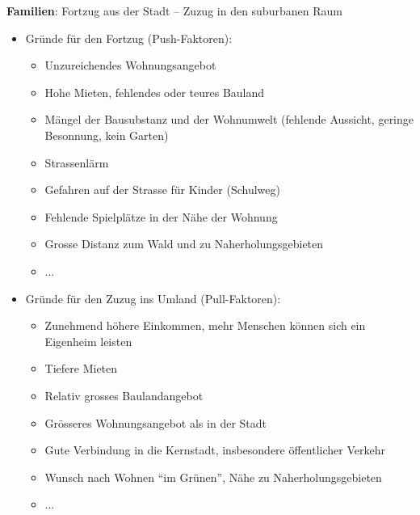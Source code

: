\begin{myexercise}
\begin{myanswer}
\textbf{Familien}: Fortzug aus der Stadt – Zuzug in den suburbanen Raum
\begin{itemize}
    \item Gründe für den Fortzug (Push-Faktoren):
    \begin{itemize}
        \item Unzureichendes Wohnungsangebot
        \item Hohe Mieten, fehlendes oder teures Bauland
        \item Mängel der Bausubstanz und der Wohnumwelt (fehlende Aussicht, geringe Besonnung, kein Garten)
        \item Strassenlärm
        \item Gefahren auf der Strasse für Kinder (Schulweg)
        \item Fehlende Spielplätze in der Nähe der Wohnung
        \item Grosse Distanz zum Wald und zu Naherholungsgebieten
        \item ...
    \end{itemize}
    \item Gründe für den Zuzug ins Umland (Pull-Faktoren):
    \begin{itemize}
        \item Zunehmend höhere Einkommen, mehr Menschen können sich ein Eigenheim leisten
        \item Tiefere Mieten
        \item Relativ grosses Baulandangebot
        \item Grösseres Wohnungsangebot als in der Stadt
        \item Gute Verbindung in die Kernstadt, insbesondere öffentlicher Verkehr
        \item Wunsch nach Wohnen ``im Grünen'', Nähe zu Naherholungsgebieten
        \item ...
    \end{itemize}
\end{itemize}


\end{myanswer}
\end{myexercise}
